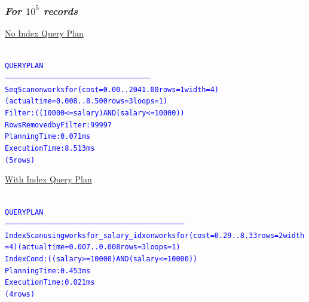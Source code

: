\documentclass{article}
\begin{document}
    \subsubsection*{\emph{For $10^5$ records}}
    \underline{No Index Query Plan}
    \begin{center}
      {\tiny
      \begin{alltt}
      \textcolor{blue}{
        QUERY PLAN                                              
        -----------------------------------------------------------------------------------------------------
         Seq Scan on worksfor  (cost=0.00..2041.00 rows=1 width=4) (actual time=0.008..8.500 rows=3 loops=1)
           Filter: ((10000 <= salary) AND (salary <= 10000))
           Rows Removed by Filter: 99997
         Planning Time: 0.071 ms
         Execution Time: 8.513 ms
        (5 rows)
       }
      \end{alltt}
      }
    \end{center}
    \underline{With Index Query Plan}
    \begin{center}
      {\tiny
      \begin{alltt}
      \textcolor{blue}{
        QUERY PLAN                                                          
        ------------------------------------------------------------------------------------------------------------------------------
         Index Scan using worksfor_salary_idx on worksfor  (cost=0.29..8.33 rows=2 width=4) (actual time=0.007..0.008 rows=3 loops=1)
           Index Cond: ((salary >= 10000) AND (salary <= 10000))
         Planning Time: 0.453 ms
         Execution Time: 0.021 ms
        (4 rows)
       }
      \end{alltt}
      }
    \end{center}
\end{document}
